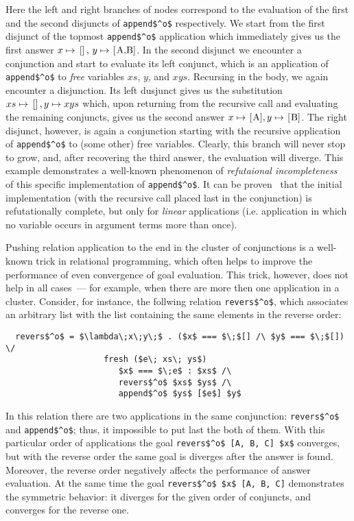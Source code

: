Here the left and right branches of nodes correspond to the evaluation of the first and the second disjuncts of \lstinline|append$^o$| respectively. We start from
the first disjunct of the topmost \lstinline|append$^o$| application which immediately gives us the first answer $x\mapsto\mbox{\lstinline|[]|},\,y\mapsto\mbox{\lstinline|[A,B]|}$.
In the second disjunct we encounter a conjunction and start to evaluate its left conjunct, which is an application of \lstinline|append$^o$| to \emph{free} variables
$xs$, $y$, and $xys$. Recursing in the body, we again encounter a disjunction. Its left dusjunct gives us the substitution $xs\mapsto\mbox{\lstinline|[]|},y\mapsto xys$ which, upon 
returning from the recursive call and evaluating the remaining conjuncts, gives us the second answer $x\mapsto\mbox{\lstinline|[A]|},y\mapsto\mbox{\lstinline|[B]|}$. The right
disjunct, however, is again a conjunction starting with the recursive application of \lstinline|append$^o$| to (some other) free variables. Clearly, this branch will never stop to
grow, and, after recovering the third answer, the evaluation will diverge. This example demonstrates a well-known phenomenon of \emph{refutaional incompleteness}~\cite{fair:WillThesis}
of this specific implementation of \lstinline|append$^o$|. It can be proven~\cite{fair:semantics} that the initial implementation (with the recursive call placed last in the conjunction)
is refutationally complete, but only for \emph{linear} applications (i.e. application in which no variable occurs in argument terms more than once).

Pushing relation application to the end in the cluster of conjunctions is a well-known trick in relational programming, which often helps to improve the performance of even
convergence of goal evaluation. This trick, however, does not help in all cases~--- for example, when there are more then one application in a cluster. Consider, for instance, the
follwing relation \lstinline{revers$^o$}, which associates an arbitrary list with the list containing the same elements in the reverse order:

\begin{lstlisting}
  revers$^o$ = $\lambda\;x\;y\;$ . ($x$ === $\;$[] /\ $y$ === $\;$[]) \/
                    fresh ($e\; xs\; ys$) 
                       $x$ === $\;e$ : $xs$ /\ 
                       revers$^o$ $xs$ $ys$ /\
                       append$^o$ $ys$ [$e$] $y$
\end{lstlisting}

In this relation there are two applications in the same conjunction: \lstinline{revers$^o$} and \lstinline{append$^o$}; thus, it impossible to put last the both of them. With this particular
order of applications the goal \lstinline|revers$^o$ [A, B, C] $x$| converges, but with the reverse order the same goal is diverges after the answer is found. Moreover, the reverse order negatively
affects the performance of answer evaluation. At the same time the goal \lstinline|revers$^o$ $x$ [A, B, C]| demonstrates the symmetric behavior: it diverges for the given order of conjuncts,
and converges for the reverse one.

